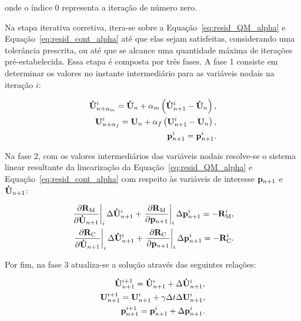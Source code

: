 \noindent onde o índice $0$ representa a iteração de número zero. 

Na etapa iterativa corretiva, itera-se sobre a Equação~\eqref{eq:resid_QM_alpha} e Equação~\eqref{eq:resid_cont_alpha} até que elas sejam satisfeitas, considerando uma tolerância prescrita, ou até que se alcance uma quantidade máxima de iterações pré-estabelecida. Essa etapa é composta por três fases. A fase 1 consiste em determinar os valores no instante intermediário para as variáveis nodais na iteração $i$:

\begin{align}
\mathbf{\dot{U}}_{n+\alpha_m}^{i} = \mathbf{\dot{U}}_n + \alpha_m \left( \mathbf{\dot{U}}_{n+1}^{i} - \mathbf{\dot{U}}_n \right), \label{eq:inter_acel_i}\\
\mathbf{U}_{n+\alpha_f}^{i} = \mathbf{U}_n + \alpha_f \left( \mathbf{U}_{n+1}^{i} - \mathbf{U}_n \right), \label{eq:inter_vel_i}\\
\mathbf{p}_{n+1}^{i} = \mathbf{p}_{n+1}^{i} \label{eq:inter_press_i}.
\end{align}

Na fase 2, com os valores intermediários das variáveis nodais resolve-se o sistema linear resultante da linearização da Equação~\eqref{eq:resid_QM_alpha} e Equação~\eqref{eq:resid_cont_alpha} com respeito às variáveis de interesse $\mathbf{p}_{n+1}$ e $\mathbf{\dot{U}}_{n+1}$:

\begin{align}
\left .\frac{\partial\mathbf{R}_\mathrm{M}}{\partial\mathbf{\dot{U}}_{n+1}}\right|_{i} \Delta \mathbf{\dot{U}}_{n+1}^{i} + \left .\frac{\partial\mathbf{R}_\mathrm{M}}{\partial\mathbf{p}_{n+1}}\right|_{i} \Delta \mathbf{p}_{n+1}^{i} = -\mathbf{R}_\mathrm{M}^{i}, \label{eq:eq_lin_QM} \\
\left .\frac{\partial\mathbf{R}_\mathrm{C}}{\partial\mathbf{\dot{U}}_{n+1}}\right|_{i} \Delta \mathbf{\dot{U}}_{n+1}^{i} + \left .\frac{\partial\mathbf{R}_\mathrm{C}}{\partial\mathbf{p}_{n+1}}\right|_{i} \Delta \mathbf{p}_{n+1}^{i} = -\mathbf{R}_\mathrm{C}^{i}.\label{eq:eq_lin_cont}
\end{align}

Por fim, na fase 3 atualiza-se a solução através das seguintes relações:

\begin{align}
\mathbf{\dot{U}}_{n+1}^{i+1} = \mathbf{\dot{U}}_{n+1}^{i} + \Delta\mathbf{\dot{U}}_{n+1}^{i},\label{eq:atu_acel} \\ 
\mathbf{U}_{n+1}^{i+1} = \mathbf{U}_{n+1}^{i} + \gamma \Delta t \Delta\mathbf{U}_{n+1}^{i},\label{eq:atu_vel}\\
\mathbf{p}_{n+1}^{i+1} = \mathbf{p}_{n+1}^{i} + \Delta\mathbf{p}_{n+1}^{i}.\label{eq:atu_press}
\end{align}

